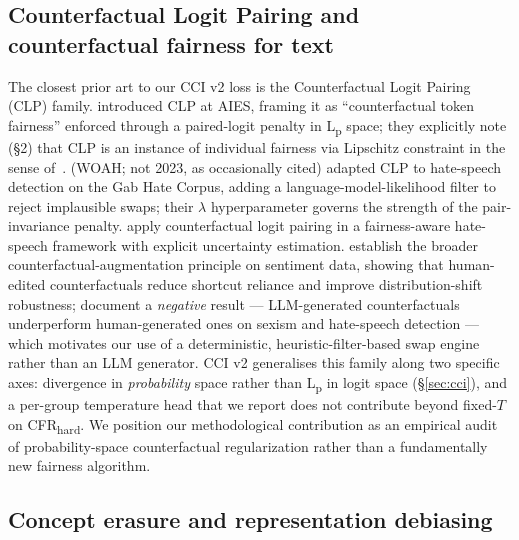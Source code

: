 \subsection{Counterfactual Logit Pairing and counterfactual fairness for text}
\label{sec:related:clp}

The closest prior art to our CCI v2 loss is the Counterfactual Logit Pairing (CLP) family. \citet{garg2019counterfactual} introduced CLP at AIES, framing it as ``counterfactual token fairness'' enforced through a paired-logit penalty in L\textsubscript{p} space; they explicitly note (\S2) that CLP is an instance of individual fairness via Lipschitz constraint in the sense of~\citet{dwork2012fairness}. \citet{davani2021improving} (WOAH; not 2023, as occasionally cited) adapted CLP to hate-speech detection on the Gab Hate Corpus, adding a language-model-likelihood filter to reject implausible swaps; their $\lambda$ hyperparameter governs the strength of the pair-invariance penalty. \citet{mou2024fairness} apply counterfactual logit pairing in a fairness-aware hate-speech framework with explicit uncertainty estimation. \citet{kaushik2020learning} establish the broader counterfactual-augmentation principle on sentiment data, showing that human-edited counterfactuals reduce shortcut reliance and improve distribution-shift robustness; \citet{sen2023people} document a \emph{negative} result --- LLM-generated counterfactuals underperform human-generated ones on sexism and hate-speech detection --- which motivates our use of a deterministic, heuristic-filter-based swap engine rather than an LLM generator. CCI v2 generalises this family along two specific axes: divergence in \emph{probability} space rather than L\textsubscript{p} in logit space (\S\ref{sec:cci}), and a per-group temperature head that we report does not contribute beyond fixed-$T$ on CFR\textsubscript{hard}. We position our methodological contribution as an empirical audit of probability-space counterfactual regularization rather than a fundamentally new fairness algorithm.

\subsection{Concept erasure and representation debiasing}
\label{sec:related:erasure}

